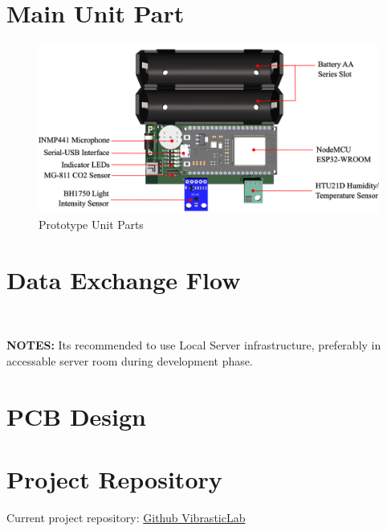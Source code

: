 \documentclass[a4paper,12pt,oneside,pdflatex,italian,final,twocolumn]{article}
\begin{document}
	\raggedright
	\section{Main Unit Part}

	\centering
	\begin{figure}[!ht]
		\centering
		\includegraphics[width=\textwidth,]{images/node_part.png}
		\caption{Prototype Unit Parts}
	\end{figure}

	\raggedright
	\section{Data Exchange Flow}

	\\

	\vspace{5pt}

	\textbf{NOTES:} Its recommended to use Local Server infrastructure, preferably in accessable server room during development phase.

	\raggedright
	\section{PCB Design}

	\newpage
	

	\newpage
	

	\raggedright
	\section{Project Repository}

	Current project repository: \href{https://github.com/VibrasticLab/smarthome_proto}{Github VibrasticLab}
\end{document}
